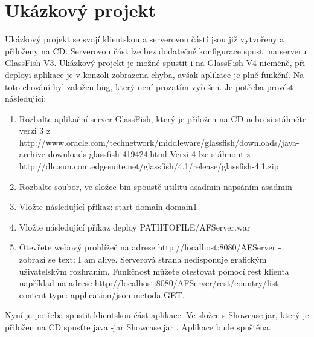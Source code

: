 \section{Ukázkový projekt}
Ukázkový projekt se svojí klientskou a serverovou částí jsou již vytvořeny a přiloženy na CD. Serverovou část lze bez dodatečné konfigurace spusti na serveru GlassFish V3. Ukázkový projekt je možné spustit i na GlassFish V4 nicméně, při deployi aplikace je v konzoli zobrazena chyba, avšak aplikace je plně funkční. Na toto chování byl založen bug, který není prozatím vyřešen. Je potřeba provést následující:
\begin{enumerate}
\item Rozbalte aplikační server GlassFish, který je přiložen na CD nebo si stáhněte verzi 3 z http://www.oracle.com/technetwork/middleware/glassfish/downloads/java-archive-downloads-glassfish-419424.html Verzi 4 lze stáhnout z http://dlc.sun.com.edgesuite.net/glassfish/4.1/release/glassfish-4.1.zip
\item Rozbalte soubor, ve složce bin spoustě utilitu asadmin napsáním asadmin
\item Vložte následující příkaz: start-domain domain1
\item Vložte následující příkaz deploy PATHTOFILE/AFServer.war
\item Otevřete webový prohlížeč na adrese http://localhost:8080/AFServer - zobrazí se text: I am alive. Serverová strana nedisponuje grafickým uživatelským rozhraním. Funkčnost můžete otestovat pomocí rest klienta například na adrese http://localhost:8080/AFServer/rest/country/list - content-type: application/json metoda GET.
\end{enumerate}
Nyní je potřeba spustit klientskou část aplikace. Ve složce s Showcase.jar, který je přiložen na CD spusťte java -jar Showcase.jar . Aplikace bude spuštěna.


